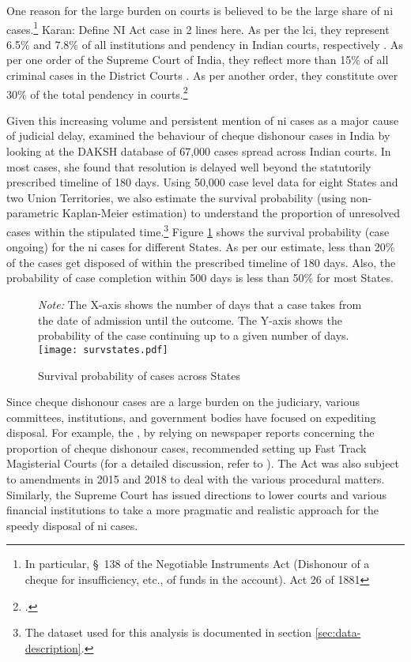 \documentclass[12pt,a4paper]{article}
\begin{document}
One reason for the large burden on courts is believed to be the large share of \gls{ni} cases.\footnote{In particular, \S~138 of the Negotiable Instruments Act (Dishonour of a cheque for insufficiency, etc., of funds in the account). Act 26 of 1881} {\color{red} Karan: Define NI Act case in 2 lines here.} As per the \gls{lci}, they represent 6.5\% and 7.8\% of all institutions and pendency in Indian courts, respectively \autocite{lci2014_arrears}. As per one order of the Supreme Court of India, they reflect more than 15\% of all criminal cases in the District Courts \autocite{sc2020_makwanavstate}. As per another order, they constitute over 30\% of the total pendency in courts.\footcite[Similarly, a study published by the Department of Justice briefly touches on the burden of such cases on the judiciary and posits that they constitute 34\% of pending criminal cases in Maharashtra.][]{sc2020_138, mahadik2018_maharashtra}

Given this increasing volume and persistent mention of \gls{ni} cases as a major cause of judicial delay, \cite{sridhar2017_cheque} examined the behaviour of cheque dishonour cases in India by looking at the DAKSH database of 67,000 cases spread across Indian courts. In most cases, she found that resolution is delayed well beyond the statutorily prescribed timeline of 180 days. Using 50,000 case level data for eight States and two Union Territories, we also estimate the survival probability (using non-parametric Kaplan-Meier estimation) to understand the proportion of unresolved cases within the stipulated time.\footnote{The dataset used for this analysis is documented in section \ref{sec:data-description}.} Figure \ref{fig:stateSurvival} shows the survival probability (case ongoing) for the \gls{ni} cases for different States. As per our estimate, less than 20\% of the cases get disposed of within the prescribed timeline of 180 days. Also, the probability of case completion within 500 days is less than 50\% for most States.

\begin{figure}[!ht]
\centering
\caption{Survival probability of cases across States}\label{fig:stateSurvival}
\footnotesize
\textit{Note:} The X-axis shows the number of days that a case takes from the date of admission until the outcome. The Y-axis shows the probability of the case continuing up to a given number of days.
\texttt{[image: survstates.pdf]}
\end{figure}

Since cheque dishonour cases are a large burden on the judiciary, various committees, institutions, and government bodies have focused on expediting disposal. For example, the \cite{lci2008_138}, by relying on newspaper reports concerning the proportion of cheque dishonour cases, recommended setting up Fast Track Magisterial Courts (for a detailed discussion, refer to \cite{bhan2015_placing}). The Act was also subject to amendments in 2015 and 2018 to deal with the various procedural matters. Similarly, the Supreme Court has issued directions to lower courts and various financial institutions to take a more pragmatic and realistic approach for the speedy disposal of \gls{ni} cases.
\end{document}
